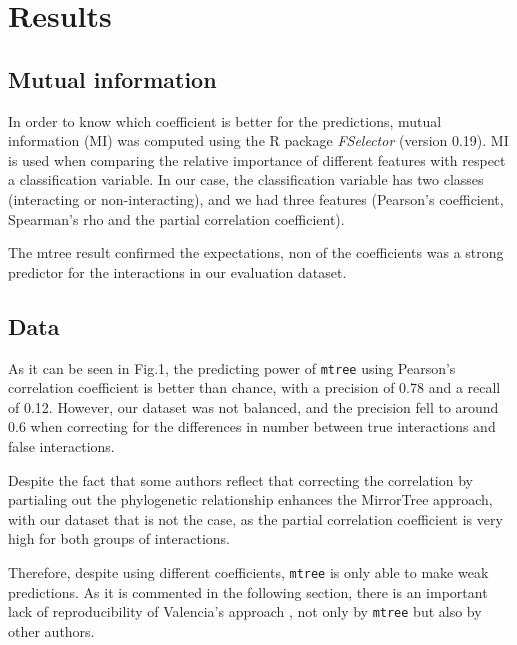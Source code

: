 \documentclass[11pt]{article}
\begin{document}
\section{Results}
\subsection{Mutual information}
In order to know which coefficient is better for the predictions, mutual information (MI) was computed using the R package \textit{FSelector} (version 0.19). MI is used when comparing the relative importance of different features with respect a classification variable. In our case, the classification variable has two classes (interacting or non-interacting), and we had three features (Pearson's coefficient, Spearman's rho and the partial correlation coefficient). 

The mtree result confirmed the expectations, non of the coefficients was a strong predictor for the interactions in our evaluation dataset.

\subsection{Data}


As it can be seen in Fig.1, the predicting power of \texttt{mtree} using Pearson's correlation coefficient is better than chance, with a precision of 0.78 and a recall of 0.12. However, our dataset was not balanced, and the precision fell to around 0.6 when correcting for the differences in number between true interactions and false interactions.

Despite the fact that some authors\cite{Sato2005} reflect that correcting the correlation by partialing out the phylogenetic relationship enhances the MirrorTree approach, with our dataset that is not the case, as the partial correlation coefficient is very high for both groups of interactions.

Therefore, despite using different coefficients, \texttt{mtree} is only able to make weak predictions. As it is commented in the following section, there is an important lack of reproducibility of Valencia's approach \cite{Pazos2001}, not only by \texttt{mtree} but also by other authors. 
\end{document}
